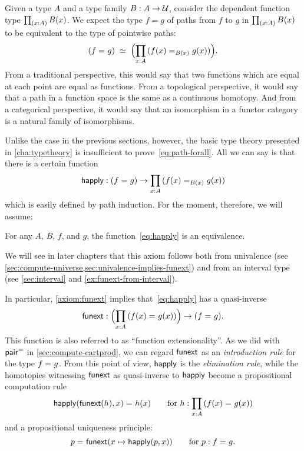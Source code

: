%
%
%
Given a type $A$ and a type family $B : A \to \mathcal{U}$, consider the dependent function type $\prd{x:A}B(x)$.
We expect the type $f=g$ of paths from $f$ to $g$ in $\prd{x:A} B(x)$ to be equivalent to
the type of pointwise paths:
\begin{equation}
  \eqvspaced{(\id{f}{g})}{\Parens{\prd{x:A} (\id[B(x)]{f(x)}{g(x)})}}.\label{eq:path-forall}
\end{equation}
From a traditional perspective, this would say that two functions which are equal at each point are equal as functions.
%
From a topological perspective, it would say that a path in a function space is the same as a continuous homotopy.
%
And from a categorical perspective, it would say that an isomorphism in a functor category is a natural family of isomorphisms.

Unlike the case in the previous sections, however, the basic type theory presented in \cref{cha:typetheory} is insufficient to prove~\eqref{eq:path-forall}.
All we can say is that there is a certain function
\begin{equation}\label{eq:happly}
  \happly : (\id{f}{g}) \to \prd{x:A} (\id[B(x)]{f(x)}{g(x)})
\end{equation}
which is easily defined by path induction.
For the moment, therefore, we will assume:

\begin{axiom}\label{axiom:funext}
  For any $A$, $B$, $f$, and $g$, the function~\eqref{eq:happly} is an equivalence.
\end{axiom}

We will see in later chapters that this axiom follows both from univalence (see \cref{sec:compute-universe,sec:univalence-implies-funext}) and from an interval type (see \cref{sec:interval} and \cref{ex:funext-from-interval}).

In particular, \cref{axiom:funext} implies that~\eqref{eq:happly} has a quasi-inverse
\[
\funext : \Parens{\prd{x:A} (\id{f(x)}{g(x)})} \to {(\id{f}{g})}.
\]
This function is also referred to as ``function extensionality''.
As we did with $\mathsf{pair}^{\mathord{=}}$ in \cref{sec:compute-cartprod}, we can regard $\mathsf{funext}$ as an \emph{introduction rule} for the type $f =_{} g$.
From this point of view, $\mathsf{happly}$ is the \emph{elimination rule}, while the homotopies witnessing $\mathsf{funext}$ as quasi-inverse to $\mathsf{happly}$ become a propositional computation rule
\[
\id{\happly({\funext{(h)}},x)}{h(x)} \qquad\text{for }h:\prd{x:A} (\id{f(x)}{g(x)})
\]
and a propositional uniqueness principle:
\[
p =_{} \mathsf{funext} (x \mapsto \mathsf{happly}(p,{x})) \qquad\text{for } p: f =_{} g.
\]

